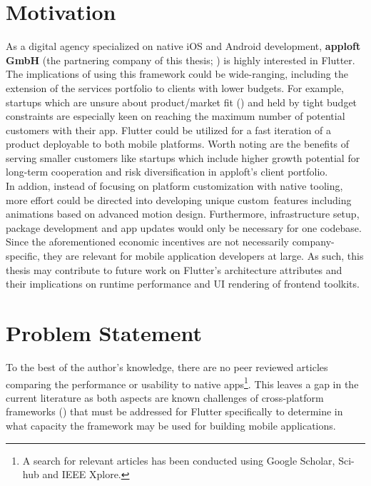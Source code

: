 \section{Motivation}
\label{section:motivation}
As a digital agency specialized on native iOS and Android development, \textbf{apploft GmbH} 
(the partnering company of this thesis; \cite{apploft2021}) is highly interested in Flutter. 
The implications of using this framework could be wide-ranging, including the extension of the services portfolio
to clients with lower budgets.
For example, startups which are unsure about product/market fit (\cite{Andreesen2007}) and held by tight budget constraints are especially keen on reaching 
the maximum number of potential customers with their app. Flutter could be utilized for a fast iteration of a product deployable to 
both mobile platforms. 
Worth noting are the benefits of serving smaller customers like startups which include higher growth potential for long-term cooperation
and risk diversification in apploft's client portfolio.\\
In addion, instead of focusing on platform customization with native tooling, more effort could 
be directed into developing unique custom features including animations based on advanced motion design.
Furthermore, infrastructure setup, package development and app updates would only be necessary for one codebase.\\
Since the aforementioned economic incentives are not necessarily company-specific, they are relevant for mobile application developers at large.
As such, this thesis may contribute to future work on Flutter's architecture attributes and their implications on runtime performance and UI rendering of frontend toolkits.

\section{Problem Statement}
To the best of the author's knowledge, there are no peer reviewed articles comparing the performance or usability to native apps\footnote{A search for relevant articles has been conducted using Google Scholar, Sci-hub and IEEE Xplore.}.
This leaves a gap in the current literature as both aspects are known challenges of cross-platform frameworks (\cite{BioernHansen2019}) that must be addressed for Flutter specifically to determine in what capacity the framework may be used for building mobile applications.

